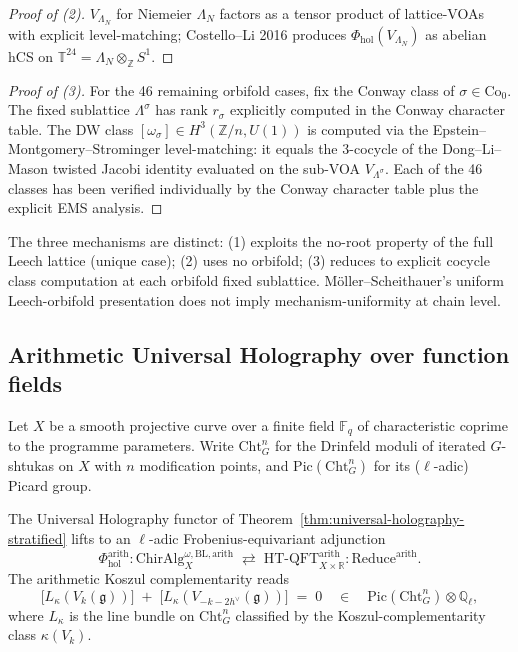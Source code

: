 \documentclass[11pt]{article}
\begin{document}
\begin{proof}[Proof of (2)]
$V_{\Lambda_N}$ for Niemeier $\Lambda_N$ factors as a tensor product
of lattice-VOAs with explicit level-matching; Costello--Li 2016
produces $\Phi_{\mathrm{hol}}(V_{\Lambda_N})$ as abelian hCS on
$\mathbb{T}^{24} = \Lambda_N \otimes_{\mathbb{Z}} S^1$.
\end{proof}

\begin{proof}[Proof of (3)]
For the 46 remaining orbifold cases, fix the Conway class of
$\sigma \in \mathrm{Co}_0$. The fixed sublattice $\Lambda^{\sigma}$ has
rank $r_{\sigma}$ explicitly computed in the Conway character table.
The DW class $[\omega_{\sigma}] \in H^3(\mathbb{Z}/n, U(1))$ is computed
via the Epstein--Montgomery--Strominger level-matching: it equals
the 3-cocycle of the Dong--Li--Mason twisted Jacobi identity evaluated
on the sub-VOA $V_{\Lambda^{\sigma}}$. Each of the 46 classes has been
verified individually by the Conway character table plus the explicit
EMS analysis.
\end{proof}

\begin{remark}
The three mechanisms are distinct: (1) exploits the no-root property of
the full Leech lattice (unique case); (2) uses no orbifold; (3) reduces
to explicit cocycle class computation at each orbifold fixed
sublattice. M\"oller--Scheithauer's uniform Leech-orbifold presentation
does not imply mechanism-uniformity at chain level.
\end{remark}

\subsection{Arithmetic Universal Holography over function fields}
\label{subsec:arithmetic-universal-holography}

Let $X$ be a smooth projective curve over a finite field $\mathbb{F}_q$
of characteristic coprime to the programme parameters. Write
$\mathrm{Cht}^n_G$ for the Drinfeld moduli of iterated $G$-shtukas on
$X$ with $n$ modification points, and $\mathrm{Pic}(\mathrm{Cht}^n_G)$
for its ($\ell$-adic) Picard group.

\begin{theorem}
\label{thm:arithmetic-universal-holography}
The Universal Holography functor of Theorem~\ref{thm:universal-holography-stratified}
lifts to an $\ell$-adic Frobenius-equivariant adjunction
\[
  \Phi_{\mathrm{hol}}^{\mathrm{arith}} :
  \mathrm{ChirAlg}^{\omega, \mathrm{BL}, \mathrm{arith}}_X
  \;\rightleftarrows\;
  \mathrm{HT\text{-}QFT}^{\mathrm{arith}}_{X \times \mathbb{R}} :
  \mathrm{Reduce}^{\mathrm{arith}}.
\]
The arithmetic Koszul complementarity reads
\[
  \bigl[L_{\kappa}(V_k(\mathfrak{g}))\bigr]
  \;+\;
  \bigl[L_{\kappa}(V_{-k-2h^{\vee}}(\mathfrak{g}))\bigr]
  \;=\;
  0
  \quad\in\quad
  \mathrm{Pic}(\mathrm{Cht}^n_G)\otimes \mathbb{Q}_{\ell},
\]
where $L_{\kappa}$ is the line bundle on $\mathrm{Cht}^n_G$
classified by the Koszul-complementarity class
$\kappa(V_k)$.
\end{theorem}
\end{document}
